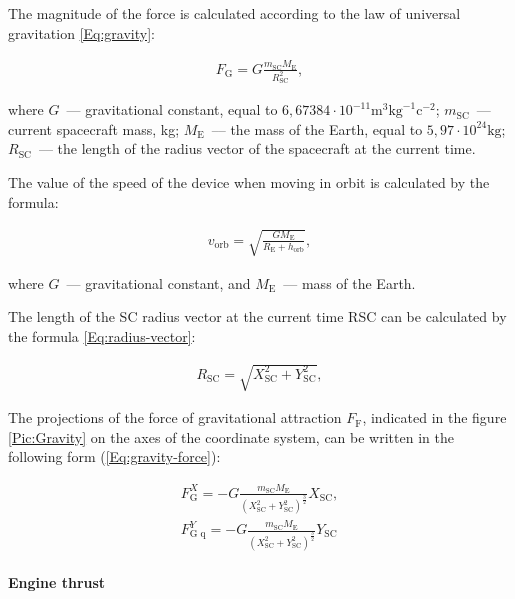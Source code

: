 \documentclass[12pt,a4paper]{article}
\begin{document}
The magnitude of the force is calculated according to the law of universal gravitation \ref{Eq:gravity}:

\begin{eqnarray}
  F_{\text{G}} = G \frac{m_{\text{SC}} M_{\text{E}}}{R_{\text{SC}}^2}, \label{Eq:gravity}
\end{eqnarray}

where $G$~--- gravitational constant, equal to $6,67384 \cdot 10^{-11} \text{m}^3
\text{kg}^{-1} \text{c}^{-2}$; $m_{\text{SC}}$~--- current spacecraft mass, kg; $M_{\text{E}}$~--–
the mass of the Earth, equal to $5,97 \cdot 10^{24} \text{kg}$; $R_{\text{SC}}$~--– the length of the radius vector of the spacecraft at the current time.

The value of the speed of the device when moving in orbit is calculated by the formula:

\begin{eqnarray}
  v_{\text{orb}} = \sqrt{\frac{G M_{\text{E}}}{R_{\text{E}} + h_{\text{orb}}}}, \label{Eq:orbital-velocity}
\end{eqnarray}

where $G$~--- gravitational constant, and $M_{\text{E}}$~--- mass of the Earth.

The length of the SC radius vector at the current time RSC can be calculated by the formula
\ref{Eq:radius-vector}:

\begin{eqnarray}
  R_{\text{SC}} = \sqrt{X_{\text{SC}}^2 + Y_{\text{SC}}^2}, \label{Eq:radius-vector}
\end{eqnarray}

The projections of the force of gravitational attraction $F_{\text{F}}$, indicated in the figure \ref{Pic:Gravity} on the axes of the coordinate system, can be written in the following form
(\ref{Eq:gravity-force}):

\begin{eqnarray}
  F_{\text{G}}^X = - G \frac{m_{\text{SC}} M_{\text{E}}}{\left(X_{\text{SC}}^2 +
    Y_{\text{SC}}^2\right)^{\frac{3}{2}}} X_{\text{SC}}, \nonumber \\
  F_{\text{G q}}^Y = - G \frac{m_{\text{SC}} M_{\text{E}}}{\left(X_{\text{SC}}^2 +
    Y_{\text{SC}}^2\right)^{\frac{3}{2}}} Y_{\text{SC}} \label{Eq:gravity-force}
\end{eqnarray}

\paragraph{Engine thrust}
\end{document}
